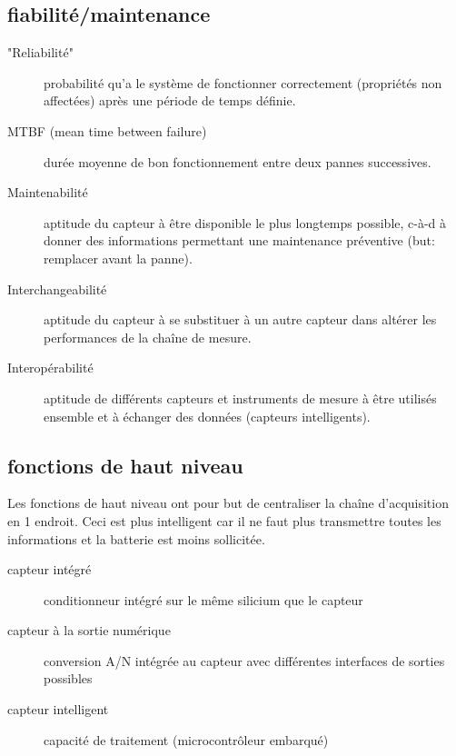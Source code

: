 \subsection{fiabilité/maintenance}
\begin{description}
	\item["Reliabilité"] probabilité qu'a le système de fonctionner correctement (propriétés non affectées) après une période de temps définie.
	\item[MTBF (mean time between failure)] durée moyenne de bon fonctionnement entre deux pannes successives.
	\item[Maintenabilité] aptitude du capteur à être disponible le plus longtemps possible, c-à-d à donner des informations permettant une maintenance préventive (but: remplacer avant la panne).
	\item[Interchangeabilité] aptitude du capteur à se substituer à un autre capteur dans altérer les performances de la chaîne de mesure.
	\item[Interopérabilité] aptitude de différents capteurs et instruments de mesure à être utilisés ensemble et à échanger des données (capteurs intelligents).
\end{description}
\subsection{fonctions de haut niveau}
Les fonctions de haut niveau ont pour but de centraliser la chaîne d'acquisition en 1 endroit. Ceci est plus intelligent car il ne faut plus transmettre toutes les informations et la batterie est moins sollicitée.
\begin{description}
	\item[capteur intégré] conditionneur intégré sur le même silicium que le capteur
	\item[capteur à la sortie numérique] conversion A/N intégrée au capteur avec différentes interfaces de sorties possibles
	\item[capteur intelligent] capacité de traitement (microcontrôleur embarqué)
\end{description}


